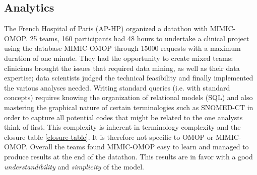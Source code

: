 %
%

\subsection{Analytics}

%
%

The French Hospital of Paris (AP-HP) organized a datathon with MIMIC-OMOP. 
25 teams, 160 participants had 48 hours to undertake a clinical project using 
the database MIMIC-OMOP through 15000 requests with a maximum duration of
one minute. They had the opportunity to create mixed teams: clinicians brought 
the issues that required data mining, as well as their data expertise; 
data scientists judged the technical feasibility and finally implemented the 
various analyses needed. Writing standard queries (i.e. with standard concepts) 
requires knowing the organization of relational models (SQL) and also mastering 
the graphical nature of certain terminologies such as SNOMED-CT in order to 
capture all potential codes that might be related to the one analysts think of 
first. This complexity is inherent in terminology complexity and the closure
table \ref{closure-table}. It is therefore not specific to OMOP or MIMIC-OMOP.
Overall the teams found MIMIC-OMOP easy to learn and managed to produce results
at the end of the datathon.
This results are in favor with a good \textit{understandibility} and
\textit{simplicity} of the model.

